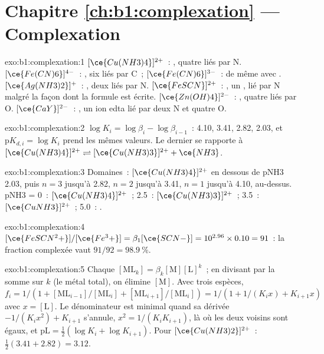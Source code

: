 \section*{Chapitre \ref{ch:b1:complexation} --- Complexation}

\begin{solution}{exo:b1:complexation:1}
$[\ce{Cu(NH3)4}]^{2+}$~: , quatre  liés par N.
$[\ce{Fe(CN)6}]^{4-}$~: , six  liés par C~;
$[\ce{Fe(CN)6}]^{3-}$~: de même avec . $[\ce{Ag(NH3)2}]^{+}$~:
, deux  liés par N. $[\ce{FeSCN}]^{2+}$~: , un
, lié par N malgré la façon dont la formule est écrite.
$[\ce{Zn(OH)4}]^{2-}$~: , quatre  liés par O.
$[\ce{CaY}]^{2-}$~: , un ion edta lié par deux N et quatre O.
\end{solution}

\begin{solution}{exo:b1:complexation:2}
$\log K_i = \log\beta_i - \log\beta_{i-1}$~: 4.10, 3.41, 2.82, 2.03, et
$\mathrm{p}K_{d,i} = \log K_i$ prend les mêmes valeurs. Le dernier se
rapporte à
$[\ce{Cu(NH3)4}]^{2+} \rightleftharpoons [\ce{Cu(NH3)3}]^{2+} + \ce{NH3}$.
\end{solution}

\begin{solution}{exo:b1:complexation:3}
Domaines~: $[\ce{Cu(NH3)4}]^{2+}$ en dessous de pNH3 2.03, puis $n = 3$
jusqu'à 2.82, $n = 2$ jusqu'à 3.41, $n = 1$ jusqu'à 4.10, 
au-dessus. pNH3 = 0~:
$[\ce{Cu(NH3)4}]^{2+}$~; 2.5~: $[\ce{Cu(NH3)3}]^{2+}$~; 3.5~:
$[\ce{CuNH3}]^{2+}$~; 5.0~: .
\end{solution}

\begin{solution}{exo:b1:complexation:4}
$[\ce{FeSCN^2+}]/[\ce{Fe^3+}] = \beta_1[\ce{SCN-}] = 10^{2.96} \times 0.10 =
91$~: la fraction complexée vaut $91/92 = \qty{98.9}{\percent}$.
\end{solution}

\begin{solution}{exo:b1:complexation:5}
Chaque $[\mathrm{ML}_k] = \beta_k[\mathrm{M}][\mathrm{L}]^k$~; en divisant
par la somme sur $k$ (le métal total), on élimine $[\mathrm{M}]$. Avec
trois espèces, $f_i = 1/(1 + [\mathrm{ML}_{i-1}]/[\mathrm{ML}_i] +
[\mathrm{ML}_{i+1}]/[\mathrm{ML}_i]) = 1/(1 + 1/(K_i x) + K_{i+1}x)$ avec
$x = [\mathrm{L}]$. Le dénominateur est minimal quand sa dérivée
$-1/(K_i x^2) + K_{i+1}$ s'annule, $x^2 = 1/(K_iK_{i+1})$, là où les deux
voisins sont égaux, et $\mathrm{pL} = \frac12(\log K_i + \log K_{i+1})$.
Pour $[\ce{Cu(NH3)2}]^{2+}$~: $\frac12(3.41 + 2.82) = 3.12$.
\end{solution}

